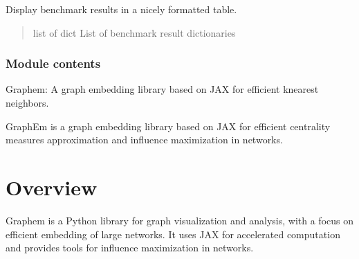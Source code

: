 \documentclass[letterpaper,10pt,english]{sphinxmanual}
\begin{document}

\begin{fulllineitems}
\label{\detokenize{graphem:graphem.visualization.display_benchmark_results}}
\pysigstartsignatures
{}
\pysigstopsignatures
\sphinxAtStartPar
Display benchmark results in a nicely formatted table.
\begin{quote}\begin{description}
\sphinxAtStartPar
{} \textendash{} list of dict
List of benchmark result dictionaries

\end{description}\end{quote}

\end{fulllineitems}



\subsection{Module contents}
\label{\detokenize{graphem:module-graphem}}\label{\detokenize{graphem:module-contents}}
\sphinxAtStartPar
Graphem: A graph embedding library based on JAX for efficient k\sphinxhyphen{}nearest neighbors.

\sphinxAtStartPar
GraphEm is a graph embedding library based on JAX for efficient centrality measures approximation and influence maximization in networks.


\chapter{Overview}
\label{\detokenize{index:overview}}
\sphinxAtStartPar
Graphem is a Python library for graph visualization and analysis, with a focus on efficient embedding of large networks. It uses JAX for accelerated computation and provides tools for influence maximization in networks.
\end{document}
